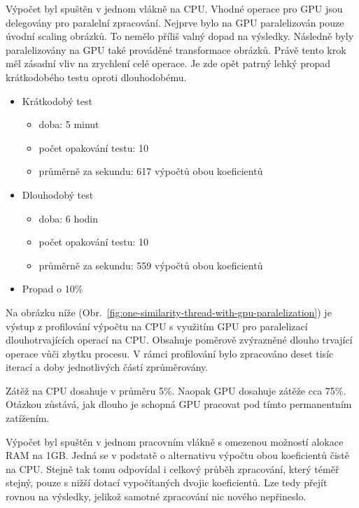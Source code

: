 Výpočet byl spuštěn v jednom vlákně na CPU. Vhodné operace pro GPU jsou delegovány pro paralelní zpracování.
Nejprve bylo na GPU paralelizován pouze úvodní scaling obrázků. To nemělo příliš valný dopad na výsledky. Následně byly paralelizovány na GPU také prováděné transformace obrázků. Právě tento krok měl zásadní vliv na zrychlení celé operace.
Je zde opět patrný lehký propad krátkodobého testu oproti dlouhodobému.
\begin{itemize}
	\setlength{\parskip}{0pt}
	\setlength{\itemsep}{0pt}
	\item {Krátkodobý test}
		\begin{itemize}
			\setlength{\parskip}{0pt}
			\setlength{\itemsep}{0pt}
			\item {doba: 5 minut}
			\item {počet opakování testu: 10}
			\item {průměrně za sekundu: 617 výpočtů obou koeficientů}
		\end{itemize}
	\item {Dlouhodobý test}
		\begin{itemize}
			\setlength{\parskip}{0pt}
			\setlength{\itemsep}{0pt}
			\item {doba: 6 hodin}
			\item {počet opakování testu: 10}
			\item {průměrně za sekundu: 559 výpočtů obou koeficientů}
		\end{itemize}
	\item {Propad o 10\%}
\end{itemize}

Na obrázku níže (Obr.~\ref{fig:one-similarity-thread-with-gpu-paralelization}) je výstup z profilování výpočtu na CPU s využitím GPU pro paralelizací dlouhotrvajících operací na CPU. Obsahuje poměrově zvýrazněné dlouho trvající operace vůči zbytku procesu. V rámci profilování bylo zpracováno deset tisíc iterací a doby jednotlivých částí zprůměrovány.

Zátěž na CPU dosahuje v průměru 5\%. Naopak GPU dosahuje zátěže cca 75\%. Otázkou zůstává, jak dlouho je schopná GPU pracovat pod tímto permanentním zatížením.

Výpočet byl spuštěn v jednom pracovním vlákně s omezenou možností alokace RAM na 1GB. Jedná se v podstatě o alternativu výpočtu obou koeficientů čistě na CPU. Stejně tak tomu odpovídal i celkový průběh zpracování, který téměř stejný, pouze s nižší dotací vypočítaných dvojic koeficientů.
Lze tedy přejít rovnou na výsledky, jelikož samotné zpracování nic nového nepřineslo.


